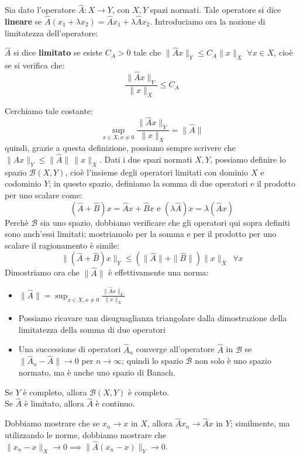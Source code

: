 Sia dato l'operatore $\hat{A}:X \to Y$, con $X, Y$ spazi normati. Tale operatore si dice \textbf{lineare} se $\hat{A}(x_1 + \lambda x_2)=\hat{A}x_1 + \lambda \hat{A}x_2$. Introduciamo ora la nozione di limitatezza dell'operatore:
\begin{definizione}
$\hat{A}$ si dice  \textbf{limitato} se esiste $C_A >0$ tale che $\| \hat{A}x \|_{Y} \leq C_A \| x \|_{X} \, \, \forall x \in X$, cioè se si verifica che:
$$\frac{\| \hat{A}x \|_{Y}}{ \| x \|_{X}}\leq C_A$$
\end{definizione}
Cerchiamo tale costante:
$$\sup_{x \in X, x \neq 0} \frac{\| \hat{A}x \|_{Y}}{ \| x \|_{X}} = \| \hat{A} \|$$
quindi, grazie a questa definizione, possiamo sempre scrivere che $\| \hat{A}x \|_{Y} \leq \| \hat{A} \| \, \| x \|_{X}$.
Dati i due spazi normati $X, Y$, possiamo definire lo spazio $\mathcal{B}(X,Y)$, cioè l'insieme degli operatori limitati con dominio $X$ e codominio $Y$; in questo spazio, definiamo la somma di due operatori e il prodotto per uno scalare come:
$$(\hat{A} + \hat{B})x=\hat{A}x + \hat{B}x \text{ e } (\lambda \hat{A})x = \lambda (\hat{A}x)$$
Perchè $\mathcal{B}$ sia uno spazio, dobbiamo verificare che gli operatori qui sopra definiti sono anch'essi limitati; mostriamolo per la somma e per il prodotto per uno scalare il ragionamento è simile:
$$\| (\hat{A} + \hat{B})x \|_Y \leq  (\| \hat{A} \| + \| \hat{B}\| ) \|x\|_X \, \, \, \forall x$$
Dimostriamo ora che $\| \hat {A} \|$ è effettivamente una norma:
\begin{itemize}
\item $ \| \hat{A} \| = \sup_{x \in X, x \neq 0} \frac{\| \hat{A}x \|_{Y}}{ \| x \|_{X}}$
\item Possiamo ricavare uan disuguaglianza triangolare dalla dimostrazione della limitatezza della somma di due operatori
\item Una successione di operatori $\hat{A}_n$ converge all'operatore $\hat{A}$ in $\mathcal{B}$ se $\|\hat{A}_n - \hat{A} \| \to 0$ per $n \to \infty$; quindi lo spazio $\mathcal{B}$ non solo è uno spazio normato, ma è anche uno spazio di Banach.
\end{itemize}
\begin{teorema}
Se $Y$ è completo, allora $\mathcal{B}(X,Y)$ è completo.\\Se $\hat{A}$ è limitato, allora $\hat{A}$ è continuo.
\end{teorema}
Dobbiamo mostrare che se $x_n \to x$ in $X$, allora $\hat{A}x_n \to \hat{A}x$ in $Y$; similmente, ma utilizzando le norme, dobbiamo mostrare che $\|x_n - x \|_X \to 0 \implies \|\hat{A}(x_n-x)\|_Y \to 0$.
